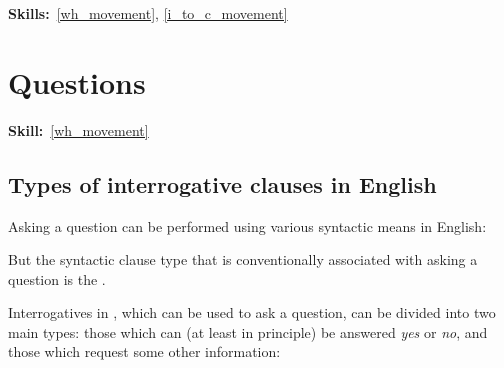 \documentclass{article}
\begin{document}
\maketitle


\subtitle{Topic 12: \emph{Wh}-movement}
\hfill{}\textbf{Skills:}~\ref{wh_movement},
\ref{i_to_c_movement}

\section{Questions}
\hfill{}\textbf{Skill:}~\ref{wh_movement}

\subsection{Types of interrogative clauses in English}

Asking a question can be performed using various syntactic means in English:
\begin{exe}
\end{exe}
But the syntactic clause type that is conventionally associated with asking a question is the . 

Interrogatives in , which can be used to ask a question, can be divided into two main types: those which can (at least in principle) be answered \emph{yes} or \emph{no}, and those which request some other information:
\end{document}
